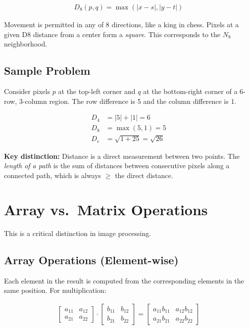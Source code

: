 \documentclass[11pt]{article}
\begin{document}
\begin{align}
    D_8(p,q) = \max(|x - s|, |y - t|)
\end{align}

Movement is permitted in any of 8 directions, like a king in chess. Pixels at a given D8 distance from a center form a \textit{square}. This corresponds to the $N_8$ neighborhood.

\subsection{Sample Problem}

Consider pixels $p$ at the top-left corner and $q$ at the bottom-right corner of a 6-row, 3-column region. The row difference is 5 and the column difference is 1.

\begin{align}
    D_4 &= |5| + |1| = 6 \\
    D_8 &= \max(5, 1) = 5 \\
    D_e &= \sqrt{1 + 25} = \sqrt{26}
\end{align}

\textbf{Key distinction:} Distance is a direct measurement between two points. The \textit{length of a path} is the sum of distances between consecutive pixels along a connected path, which is always $\geq$ the direct distance.

\newpage
\section{Array vs.\ Matrix Operations}

This is a critical distinction in image processing.

\subsection{Array Operations (Element-wise)}

Each element in the result is computed from the corresponding elements in the same position. For multiplication:

\begin{align}
    \begin{bmatrix} a_{11} & a_{12} \\ a_{21} & a_{22} \end{bmatrix}
    \cdot
    \begin{bmatrix} b_{11} & b_{12} \\ b_{21} & b_{22} \end{bmatrix}
    =
    \begin{bmatrix} a_{11}b_{11} & a_{12}b_{12} \\ a_{21}b_{21} & a_{22}b_{22} \end{bmatrix}
\end{align}
\end{document}
